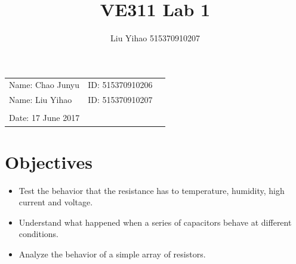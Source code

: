 \documentclass{article}
\title{VE311 Lab 1}
\author{Liu Yihao 515370910207}
\date{}
\begin{document}
\vspace*{0.25cm}

\hrulefill

\thispagestyle{empty}

\begin{center}
\begin{large}
\end{large}

\hrulefill

\vspace*{5cm}
\begin{Large}
\end{Large}

\vspace{2em}

\begin{large}
\end{large}
\end{center}

\vfill

\begin{table}[h!]
\flushleft
\begin{tabular}{lll}
Name: Chao Junyu \hspace*{2em}&
ID: 515370910206\hspace*{2em}\\
Name: Liu Yihao \hspace*{2em}&
ID: 515370910207\hspace*{2em}\\
\\

Date: 17 June 2017 

\end{tabular}
\end{table}

\hfill

\newpage
\tableofcontents
\newpage

\section{Objectives}
\begin{itemize}
	\item Test the behavior that the resistance has to temperature, humidity, high current and voltage.
	\item Understand what happened when a series of capacitors behave at different conditions.
	\item Analyze the behavior of a simple array of resistors.
\end{itemize}
\end{document}
